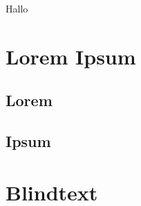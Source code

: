 Hallo
\section{Lorem Ipsum}
\subsection{Lorem}
	\lipsum[1-2]
\subsection{Ipsum}
	\lipsum[4]
\section{Blindtext}
	\blinditemize[5]
	\blindmathpaper
	